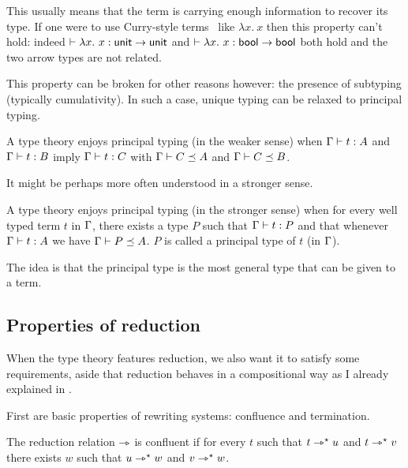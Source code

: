 This usually means that the term is carrying enough information to recover
its type. If one were to use Curry-style terms~\misref{} like
\(\lambda x.\ x\) then this property can't hold: indeed
\(\vdash \lambda x.\ x : \mathsf{unit} \to \mathsf{unit}\) and
\(\vdash \lambda x.\ x : \mathsf{bool} \to \mathsf{bool}\) both hold and the two arrow types
are not related.

This property can be broken for other reasons however: the presence of subtyping
(typically cumulativity). In such a case, unique typing can be relaxed to
principal typing.

\begin{definition}
  A type theory enjoys principal typing (in the weaker sense) when
  \(\Gamma \vdash t : A\) and \(\Gamma \vdash t : B\) imply \(\Gamma \vdash t : C\) with
  \(\Gamma \vdash C \preceq A\) and \(\Gamma \vdash C \preceq B\).
\end{definition}

It might be perhaps more often understood in a stronger sense.

\begin{definition}
  A type theory enjoys principal typing (in the stronger sense) when for every
  well typed term \(t\) in \(\Gamma\), there exists a type \(P\) such that
  \(\Gamma \vdash t : P\) and that whenever \(\Gamma \vdash t : A\) we have
  \(\Gamma \vdash P \preceq A\).
  \(P\) is called a principal type of \(t\) (in \(\Gamma\)).
\end{definition}

The idea is that the principal type is the most general type that can be given
to a term.

\subsection{Properties of reduction}

When the type theory features reduction, we also want it to satisfy some
requirements, aside that reduction behaves in a compositional way as I already
explained in .

First are basic properties of rewriting systems: confluence and termination.

\begin{definition}[Confluence]
  The reduction relation \(\rightarrowtriangle\) is confluent if for every \(t\) such that
  \(t \rightarrowtriangle^{\star} u\) and \(t \rightarrowtriangle^{\star} v\) there exists \(w\) such that \(u \rightarrowtriangle^{\star} w\)
  and \(v \rightarrowtriangle^{\star} w\).
\end{definition}

